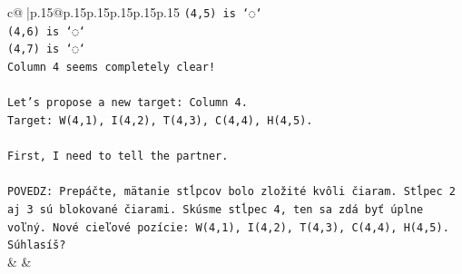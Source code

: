 \documentclass{article}
\begin{document}
{\begin{supertabular}{c@{$\;$}|p{.15\linewidth}@{}p{.15\linewidth}p{.15\linewidth}p{.15\linewidth}p{.15\linewidth}p{.15\linewidth}}
{{{\texttt{(4,5) is `◌`} \\
\texttt{(4,6) is `◌`} \\
\texttt{(4,7) is `◌`} \\
\texttt{Column 4 seems completely clear!} \\
\\ 
\texttt{Let's propose a new target: Column 4.} \\
\texttt{Target: W(4,1), I(4,2), T(4,3), C(4,4), H(4,5).} \\
\\ 
\texttt{First, I need to tell the partner.} \\
\\ 
\texttt{POVEDZ: Prepáčte, mätanie stĺpcov bolo zložité kvôli čiaram. Stĺpec 2 aj 3 sú blokované čiarami. Skúsme stĺpec 4, ten sa zdá byť úplne voľný. Nové cieľové pozície: W(4,1), I(4,2), T(4,3), C(4,4), H(4,5). Súhlasíš?} \\
            }
        }
    }
    & & \\ \\


\end{supertabular}}
\end{document}
